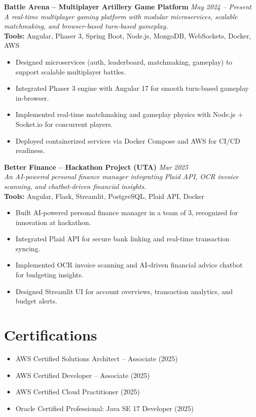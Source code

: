 \documentclass[10pt, letterpaper]{article}
\newenvironment{highlights}{\begin{itemize}[topsep=0.05cm,parsep=0.05cm,partopsep=0pt,itemsep=2pt,leftmargin=10pt]}{\end{itemize}}
\begin{document}
\textbf{Battle Arena – Multiplayer Artillery Game Platform} \hfill \textit{May 2024 – Present} \\
\textit{A real-time multiplayer gaming platform with modular microservices, scalable matchmaking, and browser-based turn-based gameplay.} \\
\textbf{Tools: } Angular, Phaser 3, Spring Boot, Node.js, MongoDB, WebSockets, Docker, AWS \\
\begin{highlights}
    \item Designed microservices (auth, leaderboard, matchmaking, gameplay) to support scalable multiplayer battles.
    \item Integrated Phaser 3 engine with Angular 17 for smooth turn-based gameplay in-browser.
    \item Implemented real-time matchmaking and gameplay physics with Node.js + Socket.io for concurrent players.
    \item Deployed containerized services via Docker Compose and AWS for CI/CD readiness.
\end{highlights}
\vspace{0.3cm}

\textbf{Better Finance – Hackathon Project (UTA)} \hfill \textit{Mar 2025} \\
\textit{An AI-powered personal finance manager integrating Plaid API, OCR invoice scanning, and chatbot-driven financial insights.} \\
\textbf{Tools: } Angular, Flask, Streamlit, PostgreSQL, Plaid API, Docker \\
\begin{highlights}
    \item Built AI-powered personal finance manager in a team of 3, recognized for innovation at hackathon.
    \item Integrated Plaid API for secure bank linking and real-time transaction syncing.
    \item Implemented OCR invoice scanning and AI-driven financial advice chatbot for budgeting insights.
    \item Designed Streamlit UI for account overviews, transaction analytics, and budget alerts.
\end{highlights}


\section{Certifications}
\begin{highlights}
    \item AWS Certified Solutions Architect – Associate (2025)
    \item AWS Certified Developer – Associate (2025)
    \item AWS Certified Cloud Practitioner (2025)
    \item Oracle Certified Professional: Java SE 17 Developer (2025)
\end{highlights}
\end{document}

